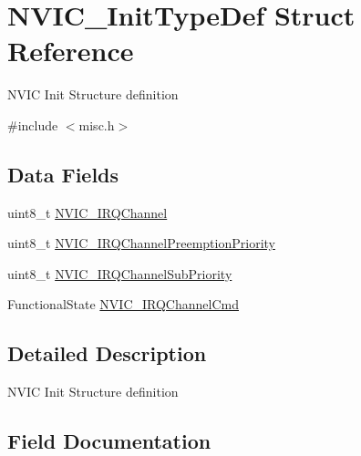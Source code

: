 \hypertarget{struct_n_v_i_c___init_type_def}{}\section{N\+V\+I\+C\+\_\+\+Init\+Type\+Def Struct Reference}
\label{struct_n_v_i_c___init_type_def}


N\+V\+IC Init Structure definition ~\newline
  




{\ttfamily \#include $<$misc.\+h$>$}

\subsection*{Data Fields}
\begin{DoxyCompactItemize}
\item 
uint8\+\_\+t \mbox{\hyperlink{struct_n_v_i_c___init_type_def_ae972a759b8b04f3856a614315c03d2d0}{N\+V\+I\+C\+\_\+\+I\+R\+Q\+Channel}}
\item 
uint8\+\_\+t \mbox{\hyperlink{struct_n_v_i_c___init_type_def_aa395d7151e569272cbcf04420a1a4128}{N\+V\+I\+C\+\_\+\+I\+R\+Q\+Channel\+Preemption\+Priority}}
\item 
uint8\+\_\+t \mbox{\hyperlink{struct_n_v_i_c___init_type_def_a91b24559ddbc12752f2414582fb47cb9}{N\+V\+I\+C\+\_\+\+I\+R\+Q\+Channel\+Sub\+Priority}}
\item 
Functional\+State \mbox{\hyperlink{struct_n_v_i_c___init_type_def_a3c5567ef024a0489884083c88f17b4d5}{N\+V\+I\+C\+\_\+\+I\+R\+Q\+Channel\+Cmd}}
\end{DoxyCompactItemize}


\subsection{Detailed Description}
N\+V\+IC Init Structure definition ~\newline
 

\subsection{Field Documentation}
\mbox{\label{struct_n_v_i_c___init_type_def_ae972a759b8b04f3856a614315c03d2d0}} 
